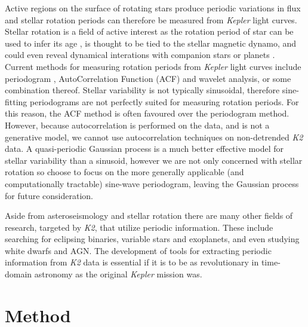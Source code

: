 \documentclass[useAMS, usenatbib]{aastex}
\begin{document}
Active regions on the surface of rotating stars produce periodic variations
in flux and stellar rotation periods can therefore be measured from
{\it Kepler} light curves.
Stellar rotation is a field of active interest as the rotation period of star
can be used to infer its age \citep{Skumanich1972, Barnes2007, Epstein2014},
is thought to be tied to the stellar magnetic dynamo, and could even reveal
dynamical interations with companion stars or planets \citep[e.g.][]{Beky2014,
Poppenhaeger2014}.
Current methods for measuring rotation periods from {\it Kepler} light curves
include periodogram \citep[e.g.][]{Reinhold2013}, AutoCorrelation Function
(ACF) \citep{McQuillan2013} and wavelet \citep[e.g.][]{Garcia2014} analysis,
or some combination thereof.
Stellar variability is not typically sinusoidal, therefore sine-fitting
periodograms are not perfectly suited for measuring rotation periods.
For this reason, the ACF method is often favoured over the periodogram method.
However, because autocorrelation is performed on the data, and is not
a generative model, we cannot use autocorrelation techniques on non-detrended
{\it K2} data.
A quasi-periodic Gaussian process is a much better effective model for stellar
variability than a sinusoid, however we are not only concerned with stellar
rotation so choose to focus on the more generally applicable (and
computationally tractable) sine-wave periodogram, leaving the Gaussian process
for future consideration.

Aside from asteroseismology and stellar rotation there are many other fields
of research, targeted by {\it K2}, that utilize periodic information.
These include searching for eclipsing binaries, variable stars and exoplanets,
and even studying white dwarfs and AGN.
The development of tools for extracting periodic information from {\it K2}
data is essential if it is to be as revolutionary in time-domain
astronomy as the original {\it Kepler} mission was.

\section{Method}
\label{Method}
\end{document}

